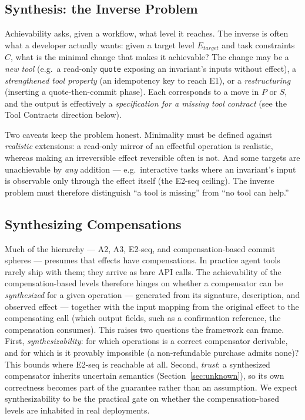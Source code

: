 \documentclass[11pt]{article}
\begin{document}
\subsection{Synthesis: the Inverse Problem}

Achievability asks, given a workflow, what level it reaches. The inverse
is often what a developer actually wants: given a target level $E_{target}$
and task constraints $C$, what is the minimal change that makes it
achievable? The change may be a \emph{new tool} (e.g.\ a read-only
\texttt{quote} exposing an invariant's inputs without effect), a
\emph{strengthened tool property} (an idempotency key to reach E1), or a
\emph{restructuring} (inserting a quote-then-commit phase). Each
corresponds to a move in $P$ or $S$, and the output is effectively a
\emph{specification for a missing tool contract} (see the Tool Contracts
direction below).

Two caveats keep the problem honest. Minimality must be defined against
\emph{realistic} extensions: a read-only mirror of an effectful operation
is realistic, whereas making an irreversible effect reversible often is
not. And some targets are unachievable by \emph{any} addition --- e.g.\
interactive tasks where an invariant's input is observable only through the
effect itself (the E2-seq ceiling). The inverse problem must therefore
distinguish ``a tool is missing'' from ``no tool can help.''

\subsection{Synthesizing Compensations}

Much of the hierarchy --- A2, A3, E2-seq, and compensation-based commit
spheres --- presumes that effects have compensations. In practice agent
tools rarely ship with them; they arrive as bare API calls. The
achievability of the compensation-based levels therefore hinges on whether
a compensator can be \emph{synthesized} for a given operation --- generated
from its signature, description, and observed effect --- together with the
input mapping from the original effect to the compensating call (which
output fields, such as a confirmation reference, the compensation consumes).
This raises two questions the framework can frame. First,
\emph{synthesizability}: for which operations is a correct compensator
derivable, and for which is it provably impossible (a non-refundable
purchase admits none)? This bounds where E2-seq is reachable at all. Second,
\emph{trust}: a synthesized compensator inherits uncertain semantics
(Section~\ref{sec:unknown}), so its own correctness becomes part of the
guarantee rather than an assumption. We expect synthesizability to be the
practical gate on whether the compensation-based levels are inhabited in
real deployments.
\end{document}

